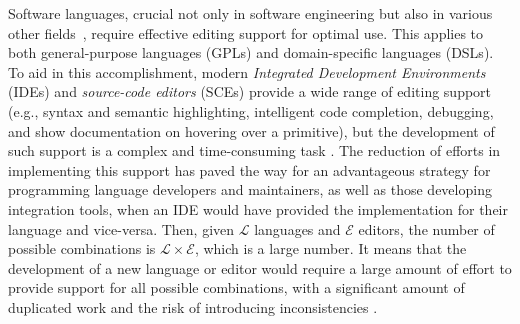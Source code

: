 Software languages, crucial not only in software engineering but also in various other fields~\cite{Paulin93, Colmerauer90}, require effective editing support for optimal use.
This applies to both general-purpose languages (GPLs) and domain-specific languages (DSLs).
To aid in this accomplishment, modern \textit{Integrated Development Environments} (IDEs) and \textit{source-code editors} (SCEs) provide a wide range of editing support (e.g., syntax and semantic highlighting, intelligent code completion, debugging, and show documentation on hovering over a primitive), but the development of such support is a complex and time-consuming task \cite{Rodriguez-Echeverria18}.
The reduction of efforts in implementing this support has paved the way for an advantageous strategy for programming language developers and maintainers, as well as those developing integration tools, when an IDE would have provided the implementation for their language and vice-versa.
Then, given $\mathcal{L}$ languages and $\mathcal{E}$ editors, the number of possible combinations is $\mathcal{L} \times \mathcal{E}$, which is a large number.
It means that the development of a new language or editor would require a large amount of effort to provide support for all possible combinations, with a significant amount of duplicated work and the risk of introducing inconsistencies \cite{Rask21}.

